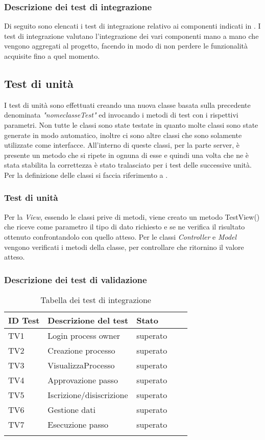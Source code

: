 \subsubsection{Descrizione dei test di integrazione}
Di seguito sono elencati i test di integrazione relativo ai componenti indicati in \infoST. I test di integrazione valutano l'integrazione dei vari componenti mano a mano che vengono aggregati al progetto, facendo in modo di non perdere le funzionalità acquisite fino a quel momento.

\subsection{Test di unità}
I test di unità sono effettuati creando una nuova classe basata sulla precedente denominata \textit{"nomeclasseTest"} ed invocando i metodi di test con i rispettivi parametri. 
Non tutte le classi sono state testate in quanto molte classi sono state generate in modo automatico, inoltre ci sono altre classi che sono solamente utilizzate come interfacce. All'interno di queste classi, per la parte server, è presente un metodo che si ripete in ognuna di esse e quindi una volta che ne è stata stabilita la correttezza è stato tralasciato per i test delle successive unità.
Per la definizione delle classi si faccia riferimento a \infoDP.
\subsubsection{Test di unità}

Per la \textit{View}, essendo le classi prive di metodi, viene creato un metodo TestView() che riceve come parametro il tipo di dato richiesto e se ne verifica il risultato ottenuto confrontandolo con quello atteso.
Per le classi \textit{Controller} e \textit{Model} vengono verificati i metodi della classe, per controllare che ritornino il valore atteso.

\subsubsection{Descrizione dei test di validazione}
\begin{longtable}{lllll}
\toprule
\textbf{ID Test} & \textbf{Descrizione del test} & \textbf{Stato}\\
\toprule
TV1& Login process owner & superato\\
\midrule
TV2& Creazione processo&superato\\
\midrule
TV3& VisualizzaProcesso&superato\\
\midrule
TV4& Approvazione passo&superato\\
\midrule
TV5& Iscrizione/disiscrizione&superato\\
\midrule
TV6& Gestione dati&superato\\
\midrule
TV7& Esecuzione passo&superato\\
\bottomrule
\caption{Tabella dei test di integrazione}
\end{longtable}



